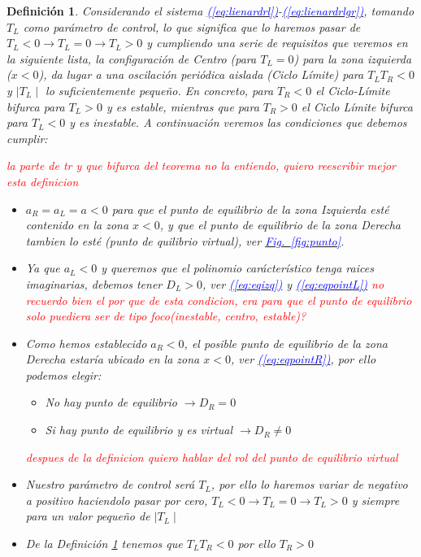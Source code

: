 \documentclass[12pt,a4paper]{report} %
\newtheorem{definicion}{Definición}[chapter] %
\newcommand{\fref}[1]{\hyperref[#1]{\textcolor{blue}{\textit{Fig.~\ref*{#1}}}}}
\newcommand{\eref}[1]{\hyperref[#1]{\textcolor{blue}{\textit{(\ref*{#1})}}}}
\begin{document}
	\begin{definicion}
		\label{def:2.7}
		Considerando el sistema \eref{eq:lienardrl}-\eref{eq:lienardrlgr}, tomando $T_L$ como parámetro de control, lo que significa que lo haremos pasar de $T_L<0 \rightarrow T_L=0 \rightarrow T_L>0$ y cumpliendo una serie de requisitos que veremos en la siguiente lista, la configuración de Centro (para $T_L=0$) para la zona izquierda ($x<0$), da lugar a una oscilación periódica aislada (Ciclo Límite) para $T_LT_R<0$ y $\mid T_L \mid$ lo suficientemente pequeño. En concreto, para $T_R<0$ el Ciclo-Límite bifurca para $T_L>0$ y es estable, mientras que para $T_R>0$ el Ciclo Límite bifurca para $T_L<0$ y es inestable. A continuación veremos las condiciones que debemos cumplir:
		
		\textit{\textcolor{red}{la parte de tr y que bifurca del teorema no la entiendo, quiero reescribir mejor esta definicion}}
		
		\begin{itemize}
			\item $a_R=a_L=a<0$ para que el punto de equilibrio de la zona Izquierda esté contenido en la zona $x<0$, y que el punto de equilibrio de la zona Derecha tambien lo esté (punto de quilibrio virtual), ver \fref{fig:punto}.
			\item Ya que $a_L<0$ y queremos que el polinomio carácterístico  tenga raices imaginarias, debemos tener $D_L>0$, ver \eref{eq:eqizq} y \eref{eq:eqpointL} \textit{\textcolor{red}{no recuerdo bien el por que de esta condicion, era para que el punto de equilibrio solo puediera ser de tipo foco(inestable, centro, estable)?}} 
			\item Como hemos establecido $a_R<0$, el posible punto de equilibrio de la zona Derecha estaría ubicado en la zona $x<0$, ver \eref{eq:eqpointR}, por ello podemos elegir:\begin{itemize}
				\item No hay punto de equilibrio $\rightarrow D_R=0$ 
				\item Si hay punto de equilibrio y es virtual $\rightarrow D_R\neq0$ 
			\end{itemize}
			\textit{\textcolor{red}{despues de la definicion quiero hablar del rol del punto de equilibrio virtual}}
			\item Nuestro parámetro de control será $T_L$, por ello lo haremos variar de negativo a positivo haciendolo pasar por cero, $T_L<0 \rightarrow T_L=0 \rightarrow T_L>0$ y siempre para un valor pequeño de $\mid T_L \mid$
			\item De la Definición \ref{def:2.7} tenemos que $T_LT_R<0$ por ello  $T_R>0$
		\end{itemize}
	\end{definicion}
	
\end{document}
